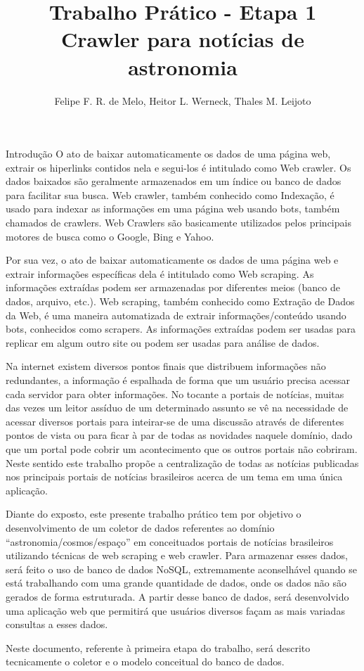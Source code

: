\documentclass{article}
\title{Trabalho Prático - Etapa 1 \\
\large Crawler para notícias de astronomia}
\author{Felipe F. R. de Melo, Heitor L. Werneck, Thales M. Leijoto}
\begin{document}
\maketitle
\begin{section}{Introdução}
O ato de baixar automaticamente os dados de uma página web, extrair os hiperlinks contidos nela e segui-los é intitulado como Web crawler. Os dados baixados são geralmente armazenados em um índice ou banco de dados para facilitar sua busca. Web crawler, também conhecido como Indexação, é usado para indexar as informações em uma página web usando bots, também chamados de crawlers. Web Crawlers são basicamente utilizados pelos principais motores de busca como o Google, Bing e Yahoo.

Por sua vez, o ato de baixar automaticamente os dados de uma página web e extrair informações específicas dela é intitulado como Web scraping. As informações extraídas podem ser armazenadas por diferentes meios (banco de dados, arquivo, etc.). Web scraping, também conhecido como Extração de Dados da Web, é uma maneira automatizada de extrair informações/conteúdo usando bots, conhecidos como scrapers. As informações extraídas podem ser usadas para replicar em algum outro site ou podem ser usadas para análise de dados.

Na internet existem diversos pontos finais que distribuem informações não redundantes, a informação é espalhada de forma que um usuário precisa acessar cada servidor para obter informações. No tocante a portais de notícias, muitas das vezes um leitor assíduo de um determinado assunto se vê na necessidade de acessar diversos portais para inteirar-se de uma discussão através de diferentes pontos de vista ou para ficar à par de todas as novidades naquele domínio, dado que um portal pode cobrir um acontecimento que os outros portais não cobriram. Neste sentido este trabalho propõe a centralização de todas as notícias publicadas nos principais portais de notícias brasileiros acerca de um tema em uma única aplicação.

Diante do exposto, este presente trabalho prático tem por objetivo o desenvolvimento de um coletor de dados referentes ao domínio “astronomia/cosmos/espaço” em conceituados portais de notícias brasileiros utilizando técnicas de web scraping e web crawler. Para armazenar esses dados, será feito o uso de banco de dados NoSQL, extremamente aconselhável quando se está trabalhando com uma grande quantidade de dados, onde os dados não são gerados de forma estruturada. A partir desse banco de dados, será desenvolvido uma aplicação web que permitirá que usuários diversos façam as mais variadas consultas a esses dados.

Neste documento, referente à primeira etapa do trabalho, será descrito tecnicamente o coletor e o modelo conceitual do banco de dados.
\end{section}
\end{document}
